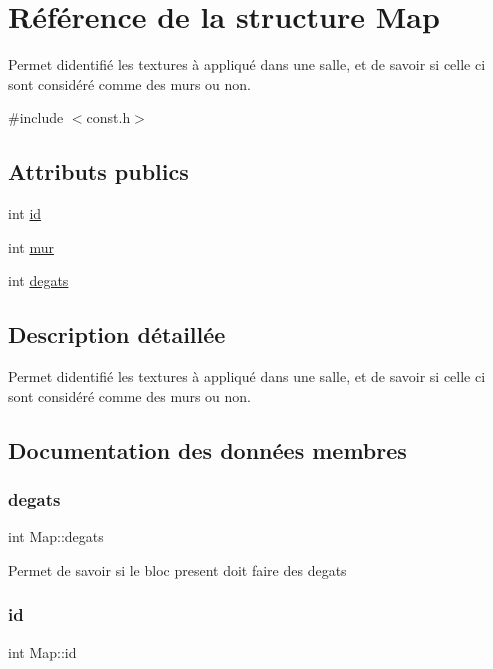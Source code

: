 \hypertarget{structMap}{}\section{Référence de la structure Map}
\label{structMap}


Permet d\textquotesingle{}identifié les textures à appliqué dans une salle, et de savoir si celle ci sont considéré comme des murs ou non.  




{\ttfamily \#include $<$const.\+h$>$}

\subsection*{Attributs publics}
\begin{DoxyCompactItemize}
\item 
int \hyperlink{structMap_ae6e78fa8c8fb5de9563b4cf6a4f743a9}{id}
\item 
int \hyperlink{structMap_a46b4593100d53988723525ed5cc28c1f}{mur}
\item 
int \hyperlink{structMap_a2db560bb02be83f35d9076931d620404}{degats}
\end{DoxyCompactItemize}


\subsection{Description détaillée}
Permet d\textquotesingle{}identifié les textures à appliqué dans une salle, et de savoir si celle ci sont considéré comme des murs ou non. 

\subsection{Documentation des données membres}
\mbox{\label{structMap_a2db560bb02be83f35d9076931d620404}} 
\subsubsection{\texorpdfstring{degats}{degats}}
{\footnotesize\ttfamily int Map\+::degats}

Permet de savoir si le bloc present doit faire des degats \mbox{\label{structMap_ae6e78fa8c8fb5de9563b4cf6a4f743a9}} 
\subsubsection{\texorpdfstring{id}{id}}
{\footnotesize\ttfamily int Map\+::id}

